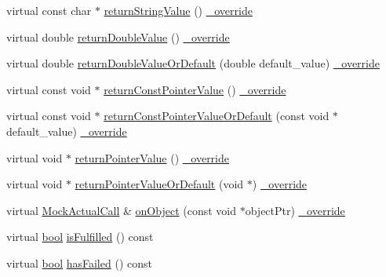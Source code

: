 \begin{DoxyCompactItemize}
\item 
virtual const char $\ast$ \hyperlink{class_mock_checked_actual_call_a8e77c2686dd05e710d0cf4b65cc8ecef}{return\+String\+Value} () \hyperlink{_cpp_u_test_config_8h_a049bea15dd750e15869863c94c1efc3b}{\+\_\+override}
\item 
virtual double \hyperlink{class_mock_checked_actual_call_a92e3571079d06427fff18c118ccb352b}{return\+Double\+Value} () \hyperlink{_cpp_u_test_config_8h_a049bea15dd750e15869863c94c1efc3b}{\+\_\+override}
\item 
virtual double \hyperlink{class_mock_checked_actual_call_a49d7dc86b0e458722e34883078622450}{return\+Double\+Value\+Or\+Default} (double default\+\_\+value) \hyperlink{_cpp_u_test_config_8h_a049bea15dd750e15869863c94c1efc3b}{\+\_\+override}
\item 
virtual const void $\ast$ \hyperlink{class_mock_checked_actual_call_abbff97f8af6ab7acb912ba62b912a457}{return\+Const\+Pointer\+Value} () \hyperlink{_cpp_u_test_config_8h_a049bea15dd750e15869863c94c1efc3b}{\+\_\+override}
\item 
virtual const void $\ast$ \hyperlink{class_mock_checked_actual_call_acb5d9810c30b2894f68e201cb70e19ed}{return\+Const\+Pointer\+Value\+Or\+Default} (const void $\ast$default\+\_\+value) \hyperlink{_cpp_u_test_config_8h_a049bea15dd750e15869863c94c1efc3b}{\+\_\+override}
\item 
virtual void $\ast$ \hyperlink{class_mock_checked_actual_call_a16396f85804380c580c6783f2fb63af2}{return\+Pointer\+Value} () \hyperlink{_cpp_u_test_config_8h_a049bea15dd750e15869863c94c1efc3b}{\+\_\+override}
\item 
virtual void $\ast$ \hyperlink{class_mock_checked_actual_call_aa39a987d15c9bb3cc3b4858254d904b6}{return\+Pointer\+Value\+Or\+Default} (void $\ast$) \hyperlink{_cpp_u_test_config_8h_a049bea15dd750e15869863c94c1efc3b}{\+\_\+override}
\item 
virtual \hyperlink{class_mock_actual_call}{Mock\+Actual\+Call} \& \hyperlink{class_mock_checked_actual_call_a05622f91f6d99311dedb4a2f821c12b2}{on\+Object} (const void $\ast$object\+Ptr) \hyperlink{_cpp_u_test_config_8h_a049bea15dd750e15869863c94c1efc3b}{\+\_\+override}
\item 
virtual \hyperlink{avb__gptp_8h_af6a258d8f3ee5206d682d799316314b1}{bool} \hyperlink{class_mock_checked_actual_call_a202e2a29251e33b754b71a2cef8a6556}{is\+Fulfilled} () const 
\item 
virtual \hyperlink{avb__gptp_8h_af6a258d8f3ee5206d682d799316314b1}{bool} \hyperlink{class_mock_checked_actual_call_ae4deec08ed507f9a2f1cced854fc5a16}{has\+Failed} () const 

\end{DoxyCompactItemize}
